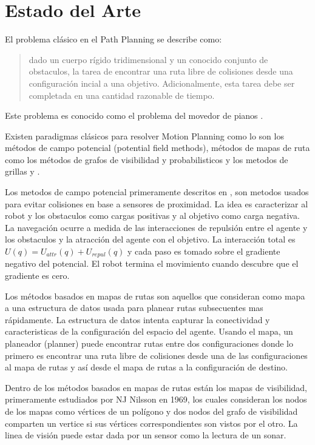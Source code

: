 \section{Estado del Arte}

El problema cl\'asico en el Path Planning se describe como:
\begin{quote}
dado un cuerpo r\'igido tridimensional y un conocido conjunto de obstaculos, la tarea de encontrar una ruta libre de colisiones desde una configuraci\'on incial a una objetivo. Adicionalmente, esta tarea debe ser completada en una cantidad razonable de tiempo. 
\end{quote}
Este problema es conocido como el problema del movedor de pianos \cite{Swartz83}. 

Existen paradigmas cl\'asicos para resolver Motion Planning como lo son los m\'etodos de campo potencial (potential field methods), m\'etodos de mapas de ruta como los m\'etodos de grafos de visibilidad y probabilisticos y los metodos de grillas \cite{Wang03} y \cite{Zhuang04} . 

Los metodos de campo potencial primeramente descritos en \cite{Kathib85}, son metodos usados para evitar colisiones en base a sensores de proximidad. La idea es caracterizar al robot y los obstaculos como cargas positivas y al objetivo como carga negativa. La navegaci\'on ocurre a medida de las interacciones de repulsi\'on entre el agente y los obstaculos y la atracci\'on del agente con el objetivo. La interacci\'on total es $U(q) = U_{attr}(q) + U_{repul}(q)$ y cada paso es tomado sobre el gradiente negativo del potencial. El robot termina el movimiento cuando descubre que el gradiente es cero.

Los m\'etodos basados en mapas de rutas son aquellos que consideran como mapa a una estructura de datos usada para planear rutas subsecuentes mas r\'apidamente. La estructura de datos intenta capturar la conectividad y caracteristicas de la configuraci\'on del espacio del agente. Usando el mapa, un planeador (planner) puede encontrar rutas entre dos configuraciones donde lo primero es encontrar una ruta libre de colisiones desde una de las configuraciones al mapa de rutas y as\'i desde el mapa de rutas a la configuraci\'on de destino.

Dentro de los m\'etodos basados en mapas de rutas est\'an los mapas de visibilidad, primeramente estudiados por NJ Nilsson en 1969, los cuales consideran los nodos de los mapas como v\'ertices de un pol\'igono y dos nodos del grafo de visibilidad comparten un vertice si sus v\'ertices correspondientes son vistos por el otro. La linea de visi\'on puede estar dada por un sensor como la lectura de un sonar. 

